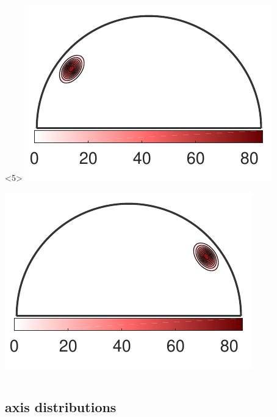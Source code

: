 \documentclass[compress]{beamer}
\begin{document}
\begin{frame}[fragile]
\begin{columns}
\begin{column}{0.33\textwidth}
\begin{overlayarea}{\textwidth}{\textheight}
    \begin{onlyenv}<5>
      \includegraphics[width=\textwidth]{pic/AxisDistri3}

      \includegraphics[width=\textwidth]{pic/AxisDistri4}
    \end{onlyenv}
  \end{overlayarea}
\end{column}
\end{columns}

\end{frame}


\subsection*{axis distributions}
\end{document}

